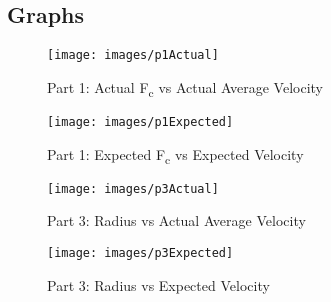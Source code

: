 \subsection{Graphs}

\begin{figure}[H]
	\captionsetup{font=Large}
	\caption{Part 1: Actual F\textsubscript{c} vs Actual Average Velocity}
	\begin{center}
		\texttt{[image: images/p1Actual]}
	\end{center}
	\label{fig:p1Actual}
\end{figure}

\begin{figure}[H]
	\captionsetup{font=Large}
	\caption{Part 1: Expected F\textsubscript{c} vs Expected Velocity}
	\begin{center}
		\texttt{[image: images/p1Expected]}
	\end{center}
	\label{fig:p1Expected}
\end{figure}


\begin{figure}[H]
	\captionsetup{font=Large}
	\caption{Part 3: Radius vs Actual Average Velocity}
	\begin{center}
		\texttt{[image: images/p3Actual]}
	\end{center}
	\label{fig:p3Actual}
\end{figure}

\begin{figure}[H]
	\captionsetup{font=Large}
	\caption{Part 3: Radius vs Expected Velocity}
	\begin{center}
		\texttt{[image: images/p3Expected]}
	\end{center}
	\label{fig:p3Expected}
\end{figure}


\newpage

